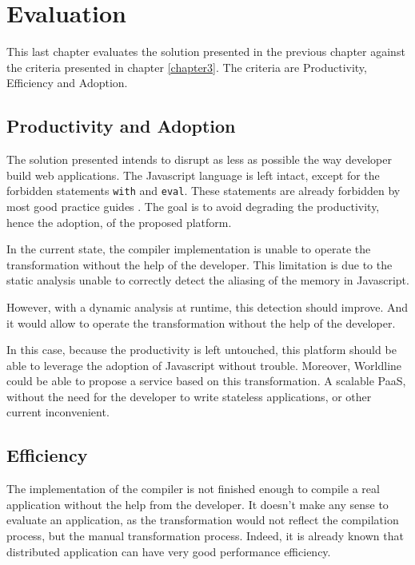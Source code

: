 \chapter{Evaluation} \label{chapter6}
\minitoc
\eject

This last chapter evaluates the solution presented in the previous chapter against the criteria presented in chapter \ref{chapter3}.
The criteria are Productivity, Efficiency and Adoption.

\section{Productivity and Adoption}

The solution presented intends to disrupt as less as possible the way developer build web applications.
The Javascript language is left intact, except for the forbidden statements \texttt{with} and \texttt{eval}.
These statements are already forbidden by most good practice guides \cite{Crockford2008}.
The goal is to avoid degrading the productivity, hence the adoption, of the proposed platform.

In the current state, the compiler implementation is unable to operate the transformation without the help of the developer.
This limitation is due to the static analysis unable to correctly detect the aliasing of the memory in Javascript.

However, with a dynamic analysis at runtime, this detection should improve.
And it would allow to operate the transformation without the help of the developer.

In this case, because the productivity is left untouched, this platform should be able to leverage the adoption of Javascript without trouble.
Moreover, Worldline could be able to propose a service based on this transformation.
A scalable PaaS, without the need for the developer to write stateless applications, or other current inconvenient.


\section{Efficiency}

The implementation of the compiler is not finished enough to compile a real application without the help from the developer.
It doesn't make any sense to evaluate an application, as the transformation would not reflect the compilation process, but the manual transformation process.
Indeed, it is already known that distributed application can have very good performance efficiency.

